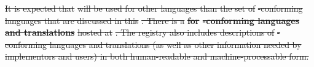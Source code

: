 \documentclass[10pt,fleqn,final]{scrreprt}
\newcommand*{\termref}[1]{\index{#1}#1\xspace}
\newcommand*{\IS}{OMG Specification\xspace}
\newcommand*{\DOL}{\ensuremath{\mathsf{DOL}}\xspace}
\newcommand{\clauserefname}{clause}
\newcommand{\cref}[1]{\clauserefname~\ref{#1}}
\newenvironment{definitions}[0]{\medskip }{}
\providecommand{\DIFdel}[1]{{\protect\color{red}\sout{#1}}}                      %
\providecommand{\DIFdelbegin}{} %
\providecommand{\DIFdelend}{} %
\begin{document}
\begin{definitions}
\DIFdelbegin %
\DIFdel{It is expected that }%
\DIFdel{will be used for other languages than the set of }%
\DIFdel{-conforming
languages that are discussed in this }%
\DIFdel{. There is 
a  }\textbf{%
\DIFdel{for }%
\DIFdel{-conforming languages and translations}} %
\DIFdel{hosted
at }%
\DIFdel{.  The registry  also includes descriptions of
}%
\DIFdel{-conforming languages and translations (as well as other information needed by implementors
and users) in both human-readable and machine-processable form.  
}\DIFdelend %

\end{definitions}
\end{document}
